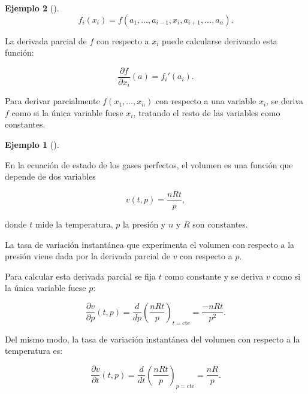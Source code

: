 \documentclass[
  a4paper,
]{scrreport}
\theoremstyle{definition}
\newtheorem{example}{Ejemplo}[chapter]
\theoremstyle{plain}
\theoremstyle{definition}
\theoremstyle{definition}
\theoremstyle{plain}
\theoremstyle{plain}
\theoremstyle{remark}
\begin{document}
\begin{example}[]
\[
f_i(x_i)=f(a_1,\ldots,a_{i-1},x_i,a_{i+1},\ldots,a_n).
\]

La derivada parcial de \(f\) con respecto a \(x_i\) puede calcularse
derivando esta función:

\[
\frac{\partial f}{\partial x_i}(a)=f_i'(a_i).
\]

\begin{tcolorbox}[enhanced jigsaw, leftrule=.75mm, colbacktitle=quarto-callout-important-color!10!white, toprule=.15mm, opacityback=0, opacitybacktitle=0.6, toptitle=1mm, breakable, bottomtitle=1mm, colframe=quarto-callout-important-color-frame, rightrule=.15mm, titlerule=0mm, title=\textcolor{quarto-callout-important-color}{\faExclamation}\hspace{0.5em}{Regla}, arc=.35mm, left=2mm, bottomrule=.15mm, colback=white, coltitle=black]

Para derivar parcialmente \(f(x_1,\ldots,x_n)\) con respecto a una
variable \(x_i\), se deriva \(f\) como si la única variable fuese
\(x_i\), tratando el resto de las variables como constantes.

\end{tcolorbox}

\begin{example}[]\protect\hypertarget{exm-calculo-derivada-parcial}{}\label{exm-calculo-derivada-parcial}

En la ecuación de estado de los gases perfectos, el volumen es una
función que depende de dos variables

\[
v(t,p)=\frac{nRt}{p},
\]

donde \(t\) mide la temperatura, \(p\) la presión y \(n\) y \(R\) son
constantes.

La tasa de variación instantánea que experimenta el volumen con respecto
a la presión viene dada por la derivada parcial de \(v\) con respecto a
\(p\).

Para calcular esta derivada parcial se fija \(t\) como constante y se
deriva \(v\) como si la única variable fuese \(p\):

\[
\frac{\partial v}{\partial p}(t,p)=\frac{d}{dp}\left(\frac{nRt}{p}\right)_{\mbox{$t=$cte}}=\frac{-nRt}{p^2}.
\]

Del mismo modo, la tasa de variación instantánea del volumen con
respecto a la temperatura es:

\[
\frac{\partial v}{\partial t}(t,p)=\frac{d}{dt}\left(\frac{nRt}{p}\right)_{\mbox{$p=$cte}}=\frac{nR}{p}.
\]

\end{example}


\end{example}
\end{document}
